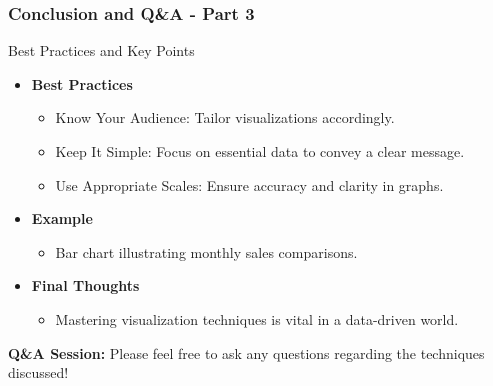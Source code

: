 \documentclass[aspectratio=169]{beamer}
\begin{document}
\begin{frame}[fragile]
    \frametitle{Conclusion and Q\&A - Part 3}
    \begin{block}{Best Practices and Key Points}
        \begin{itemize}
            \item \textbf{Best Practices}
            \begin{itemize}
                \item Know Your Audience: Tailor visualizations accordingly.
                \item Keep It Simple: Focus on essential data to convey a clear message.
                \item Use Appropriate Scales: Ensure accuracy and clarity in graphs.
            \end{itemize}
            \item \textbf{Example}
            \begin{itemize}
                \item Bar chart illustrating monthly sales comparisons.
            \end{itemize}
            \item \textbf{Final Thoughts}
            \begin{itemize}
                \item Mastering visualization techniques is vital in a data-driven world.
            \end{itemize}
        \end{itemize}
    \end{block}
    \textbf{Q\&A Session:} Please feel free to ask any questions regarding the techniques discussed!
\end{frame}
\end{document}

